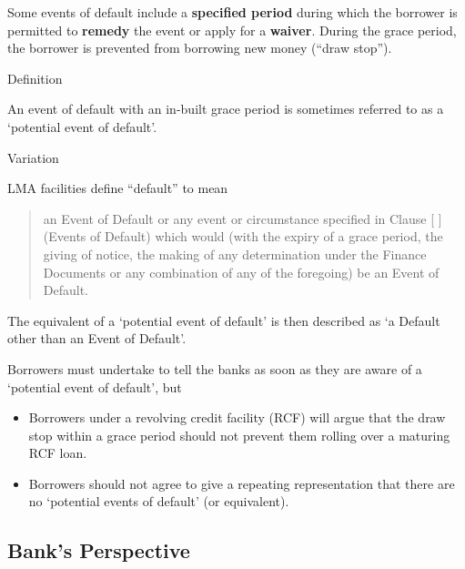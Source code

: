 \documentclass[
]{article}
\providecommand{\tightlist}{%
  \setlength{\itemsep}{0pt}\setlength{\parskip}{0pt}}
\newenvironment{env-b81a0bad-19ae-4a38-aa54-7c89ad4aa09e}
{
    \savenotes\tcolorbox[blanker,breakable,left=5pt,borderline west={2pt}{-4pt}{blue}]
}
{
    \endtcolorbox\spewnotes
}
\newenvironment{env-f09e27d9-67b8-4931-ab1f-ca6031966775}
{
    \savenotes\tcolorbox[blanker,breakable,left=5pt,borderline west={2pt}{-4pt}{yellow}]
}
{
    \endtcolorbox\spewnotes
}
\begin{document}
Some events of default include a \textbf{specified period} during which
the borrower is permitted to \textbf{remedy} the event or apply for a
\textbf{waiver}. During the grace period, the borrower is prevented from
borrowing new money (``draw stop'').

\begin{env-f09e27d9-67b8-4931-ab1f-ca6031966775}

Definition

An event of default with an in-built grace period is sometimes referred
to as a `potential event of default'.

\end{env-f09e27d9-67b8-4931-ab1f-ca6031966775}

\begin{env-b81a0bad-19ae-4a38-aa54-7c89ad4aa09e}

Variation

LMA facilities define ``default'' to mean

\begin{quote}
an Event of Default or any event or circumstance specified in Clause {[}
{]} (Events of Default) which would (with the expiry of a grace period,
the giving of notice, the making of any determination under the Finance
Documents or any combination of any of the foregoing) be an Event of
Default.
\end{quote}

The equivalent of a `potential event of default' is then described as `a
Default other than an Event of Default'.

\end{env-b81a0bad-19ae-4a38-aa54-7c89ad4aa09e}

Borrowers must undertake to tell the banks as soon as they are aware of
a `potential event of default', but

\begin{itemize}
\tightlist
\item
  Borrowers under a revolving credit facility (RCF) will argue that the
  draw stop within a grace period should not prevent them rolling over a
  maturing RCF loan.
\item
  Borrowers should not agree to give a repeating representation that
  there are no `potential events of default' (or equivalent).
\end{itemize}

\hypertarget{banks-perspective-2}{%
\subsection{Bank's Perspective}\label{banks-perspective-2}}
\end{document}

